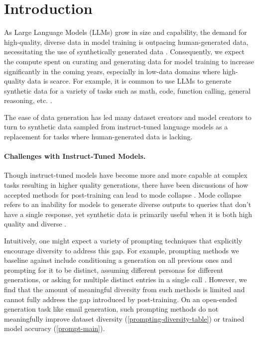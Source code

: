 \section{Introduction}
\label{introduction}

As Large Language Models (LLMs) grow in size and capability, the demand for high-quality, diverse data in model training is outpacing human-generated data, necessitating the use of synthetically generated data \cite{villalobos2024rundatalimitsllm}.
Consequently, we expect the compute spent on curating and generating data for model training to increase significantly in the coming years, especially in low-data domains where high-quality data is scarce. For example, it is common to use LLMs to generate synthetic data for a variety of tasks such as math, code, function calling, general reasoning, etc. \cite{yu2024metamathbootstrapmathematicalquestions, guo2024deepseek, patil2023gorillalargelanguagemodel, liu2024bestpracticeslessonslearned}. 

The ease of data generation has led many dataset creators \cite{samvelyan2024rainbowteamingopenendedgeneration, zhang2024raftadaptinglanguagemodel, sky_t1_2025} and model creators \cite{llama2024llama, qwen2025qwen25technicalreport, nvidia2024nemotron4340btechnicalreport, guan2025deliberativealignmentreasoningenables, sky_t1_2025} to turn to synthetic data sampled from instruct-tuned language models as a replacement for tasks where human-generated data is lacking.

\paragraph{Challenges with Instruct-Tuned Models.}
Though instruct-tuned models have become more and more capable at complex tasks resulting in higher quality generations, there have been discussions of how accepted methods for post-training can lead to mode collapse \cite{Shumailov2024, wong2024simplestratdiversifyinglanguagemodel, lambert2024self}. Mode collapse refers to an inability for models to generate diverse outputs to queries that don't have a single response, yet synthetic data is primarily useful when it is both high quality and diverse \cite{chen2024diversitysyntheticdataimpact, raventós2023pretrainingtaskdiversityemergence}.

Intuitively, one might expect a variety of prompting techniques that explicitly encourage diversity to address this gap. For example, prompting methods we baseline against include conditioning a generation on all previous ones and prompting for it to be distinct, assuming different personas for different generations, or asking for multiple distinct entries in a single call \cite{zhang-etal-2024-improving-diversity, naik2023diversity, frohling2024personas}. However, we find that the amount of meaningful diversity from such methods is limited and cannot fully address the gap introduced by post-training. On an open-ended generation task like email generation, such prompting methods do not meaningfully improve dataset diversity (\cref{prompting-diversity-table}) or trained model accuracy (\cref{prompt-main}).

